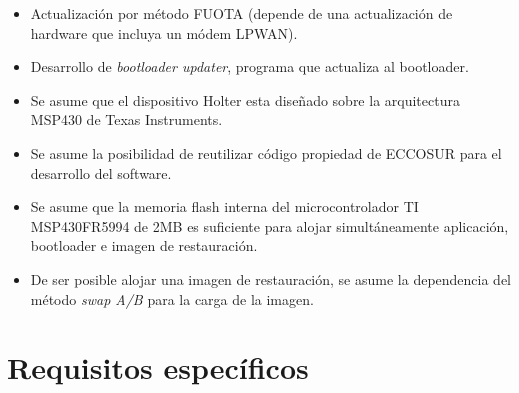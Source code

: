 \documentclass[12pt,a4paper]{article}
\begin{document}
\begin{itemize}
	\item Actualización por método FUOTA (depende de una actualización de hardware que incluya un módem LPWAN).
	
	\item Desarrollo de \textit{bootloader updater}, programa que actualiza al bootloader.

	\item Se asume que el dispositivo Holter esta diseñado sobre la arquitectura MSP430 de Texas Instruments.

	\item Se asume la posibilidad de reutilizar código propiedad de ECCOSUR para el desarrollo del software.

	\item Se asume que la memoria flash interna del microcontrolador TI MSP430FR5994 de 2MB es suficiente para alojar simultáneamente aplicación, bootloader e imagen de restauración.

	\item De ser posible alojar una imagen de restauración, se asume la dependencia del método \textit{swap A/B} para la carga de la imagen.
\end{itemize}


\section{Requisitos específicos}
\label{sec:specific_requirements}
\end{document}
